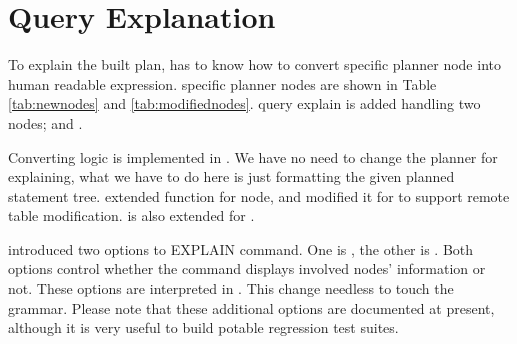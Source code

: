 
\section{\label{sec:queryExplain}Query Explanation}

  To explain the built plan, \XC{} has to know how to convert \XC{} specific planner node into
  human readable expression.
  \XC{} specific planner nodes are shown in Table \ref{tab:newnodes} and \ref{tab:modifiednodes}.
  \XC{} query explain is added handling two nodes;  and .
  
  Converting logic is implemented in .
  We have no need to change the planner for explaining, what we have to do here is just formatting
  the given planned statement tree.
  \XC{} extended  function for  node, and modified it for
   to support remote table modification.
   is also extended for .
  
  \XC{} introduced two options to EXPLAIN command.
  One is , the other is .
  Both options control whether the command displays involved nodes' information or not.
  These options are interpreted in .
  This change needless to touch the grammar.
  Please note that these additional options are documented at present, although it is very useful
  to build potable regression test suites.



